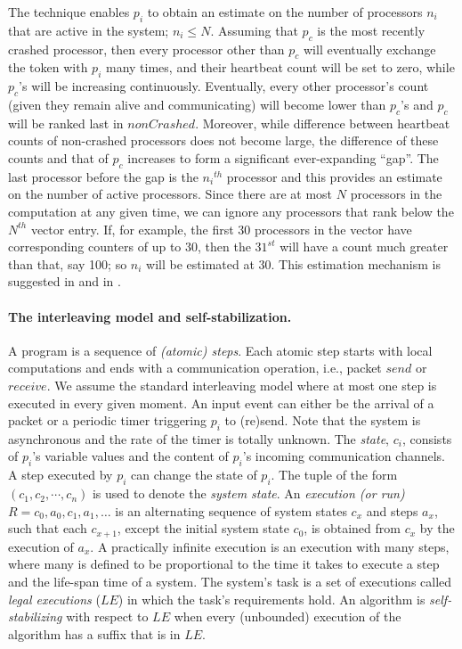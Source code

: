 \documentclass[11pt]{article}
\begin{document}
The technique enables $p_i$ to obtain an estimate on the number of processors $n_i$ that are active in the system; $n_i \leq N$. Assuming that $p_c$ is the most recently crashed processor, then every processor other than $p_c$ will eventually exchange the token with $p_i$ many times, and their heartbeat count will be set to zero, while $p_c$'s will be increasing continuously.
Eventually, every other processor's count (given they remain alive and communicating) will become lower than $p_c$'s and $p_c$ will be ranked last in $nonCrashed$.
Moreover, while difference between heartbeat counts of non-crashed processors does not become large, the difference of these counts and that of $p_c$ increases to form a significant ever-expanding ``gap''.
The last processor before the gap is the ${n_i}^{th}$ processor and this provides an estimate on the number of active processors.
Since there are at most $N$ processors in the computation at any given time, we can ignore any processors that rank below the $N^{th}$ vector entry.
If, for example, the first 30 processors in the vector have corresponding counters of up to 30, then the $31^{st}$ will have a count much greater than that, say 100; so $n_i$ will be estimated at 30.
This estimation mechanism is suggested in \cite{DBLP:journals/cjtcs/DolevH97} and in \cite{DBLP:journals/tmc/DolevSW06}. \\








\paragraph{The interleaving model and self-stabilization.}
A program is a sequence of {\em (atomic) steps}. Each atomic step starts with local computations and ends with a communication operation, i.e., packet $send$ or $receive$. We assume the standard interleaving model where at most one step is executed in every given moment.  An input event can either be the arrival of a  packet or a periodic timer triggering $p_i$ to (re)send. Note that the system is asynchronous and the rate of the timer is totally unknown. The {\em state}, $c_i$, consists of $p_i$'s variable values and the content of $p_i$'s incoming communication channels. A step executed by $p_i$ can change the state of $p_i$. The tuple of the form $(c_1, c_2, \cdots, c_n)$ is used to denote the {\em system state}. An {\em execution (or run)} $R={c_0,a_0,c_1,a_1,\ldots}$ is an alternating sequence of system states $c_x$ and steps $a_x$, such that each $c_{x+1}$, except the initial system state $c_0$, is obtained from $c_x$ by the execution of $a_x$. A practically infinite execution is an execution with many steps, where many is defined to be proportional to the time it takes to execute a step and the life-span time of a system. The system's task is a set of executions called {\em legal executions} ($LE$) in which the task's requirements hold. An algorithm is {\em self-stabilizing} with respect to $LE$ when every (unbounded) execution of the algorithm has a suffix that is in $LE$.
\end{document}

